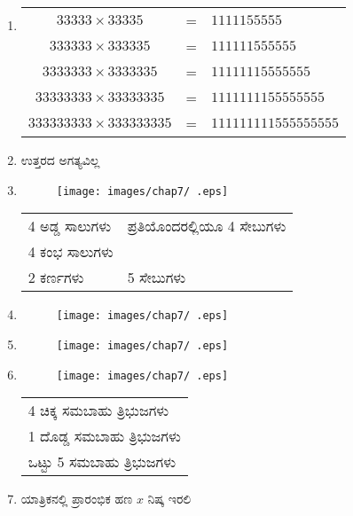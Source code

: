 \begin{enumerate}
\item 
\begin{tabular}[t]{ccl}
$33333\times 33335$ & = & $1111155555$\\
$333333\times 333335$ & = & $111111555555$\\
$3333333\times 3333335$ & = & $11111115555555$\\
$33333333\times 33333335$ &= & $1111111155555555$\\
$333333333\times 333333335$ & = & $111111111555555555$
\end{tabular}

\item ಉತ್ತರದ ಅಗತ್ಯವಿಲ್ಲ 

\item
\begin{figure}[!h]
\centering
\texttt{[image: images/chap7/ .eps]}
\end{figure}

\begin{tabular}{ll}
4 ಅಡ್ಡ ಸಾಲುಗಳು & ಪ್ರತಿಯೊಂದರಲ್ಲಿಯೂ 4 ಸೇಬುಗಳು \\
4 ಕಂಭ ಸಾಲುಗಳು  & \\[0.2cm]
2 ಕರ್ಣಗಳು & 5 ಸೇಬುಗಳು 
\end{tabular}

\item
\begin{figure}[!h]
\centering
\texttt{[image: images/chap7/ .eps]}
\end{figure}


\item
\begin{figure}[!h]
\centering
\texttt{[image: images/chap7/ .eps]}
\end{figure}

\item
\begin{figure}[!h]
\centering
\texttt{[image: images/chap7/ .eps]}
\end{figure}

\begin{tabular}{l}
4 ಚಿಕ್ಕ ಸಮಬಾಹು ತ್ರಿಭುಜಗಳು\\
1 ದೊಡ್ಡ ಸಮಬಾಹು ತ್ರಿಭುಜಗಳು\\[0.2cm]
ಒಟ್ಟು 5 ಸಮಬಾಹು ತ್ರಿಭುಜಗಳು 
\end{tabular}

\item ಯಾತ್ರಿಕನಲ್ಲಿ ಪ್ರಾರಂಭಿಕ ಹಣ $x$ ನಿಷ್ಕ ಇರಲಿ 


\end{enumerate}
